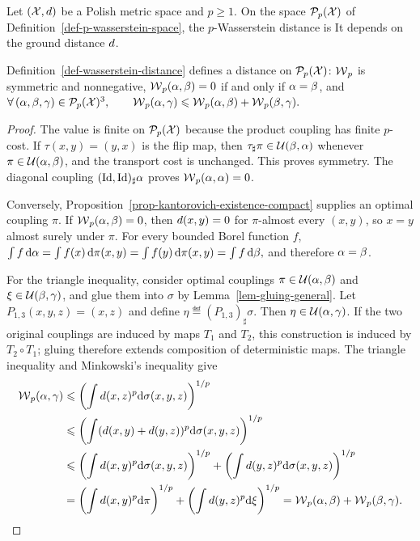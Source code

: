 \begin{defn}\label{def-wasserstein-distance}
Let $(\mathcal{X},d)$ be a Polish metric space and $p\geq1$. On the space $\mathcal{P}_p(\mathcal{X})$ of Definition~\ref{def-p-wasserstein-space}, the $p$-Wasserstein distance is
It depends on the ground distance $d$.
\end{defn}
\begin{prop}\label{prop-metric-measure}
Definition~\ref{def-wasserstein-distance} defines a distance on $\mathcal{P}_p(\mathcal{X})$: $\operatorname{\mathcal{W}}_p$ is symmetric and nonnegative, $\operatorname{\mathcal{W}}_p(\alpha,\beta)=0$ if and only if $\alpha=\beta$, and
\(\forall \, (\alpha,\beta,\gamma)\in\mathcal{P}_p(\mathcal{X})^3, \qquad \operatorname{\mathcal{W}}_p(\alpha,\gamma)\leqslant\operatorname{\mathcal{W}}_p(\alpha,\beta)+\operatorname{\mathcal{W}}_p(\beta,\gamma).\)
\end{prop}
\begin{proof}
The value is finite on $\mathcal{P}_p(\mathcal{X})$ because the product coupling has finite $p$-cost. If $\tau(x,y)=(y,x)$ is the flip map, then $\tau_\sharp\pi\in\mathcal{U}(\beta,\alpha)$ whenever $\pi\in\mathcal{U}(\alpha,\beta)$, and the transport cost is unchanged. This proves symmetry. The diagonal coupling $(\mathrm{Id},\mathrm{Id})_\sharp\alpha$ proves $\operatorname{\mathcal{W}}_p(\alpha,\alpha)=0$.

Conversely, Proposition~\ref{prop-kantorovich-existence-compact} supplies an optimal coupling $\pi$. If $\operatorname{\mathcal{W}}_p(\alpha,\beta)=0$, then $d(x,y)=0$ for $\pi$-almost every $(x,y)$, so $x=y$ almost surely under $\pi$. For every bounded Borel function $f$,
\(\int f\,\mathrm{d}\alpha = \int f(x)\,\mathrm{d}\pi(x,y) = \int f(y)\,\mathrm{d}\pi(x,y) = \int f\,\mathrm{d}\beta,\)
and therefore $\alpha=\beta$.

For the triangle inequality, consider optimal couplings $\pi\in\mathcal{U}(\alpha,\beta)$ and $\xi\in\mathcal{U}(\beta,\gamma)$,
and glue them into $\sigma$ by Lemma~\ref{lem-gluing-general}. Let $P_{1,3}(x,y,z)=(x,z)$ and define $\eta\eqdef(P_{1,3})_\sharp\sigma$. Then $\eta\in\mathcal{U}(\alpha,\gamma)$. If the two original couplings are induced by maps $T_1$ and $T_2$, this construction is induced by $T_2\circ T_1$; gluing therefore extends composition of deterministic maps.
The triangle inequality and Minkowski's inequality give
\[
\begin{aligned}
\operatorname{\mathcal{W}}_p(\alpha,\gamma)
&\leqslant\left(\int d(x,z)^p\mathrm{d}\sigma(x,y,z)\right)^{1/p}\\
&\leqslant\left(\int(d(x,y)+d(y,z))^p\mathrm{d}\sigma(x,y,z)\right)^{1/p}\\
&\leqslant\left(\int d(x,y)^p\mathrm{d}\sigma(x,y,z)\right)^{1/p}
+\left(\int d(y,z)^p\mathrm{d}\sigma(x,y,z)\right)^{1/p}\\
&=\left(\int d(x,y)^p\mathrm{d}\pi\right)^{1/p}
+\left(\int d(y,z)^p\mathrm{d}\xi\right)^{1/p}
=\operatorname{\mathcal{W}}_p(\alpha,\beta)+\operatorname{\mathcal{W}}_p(\beta,\gamma).
\end{aligned}
\]
\end{proof}
